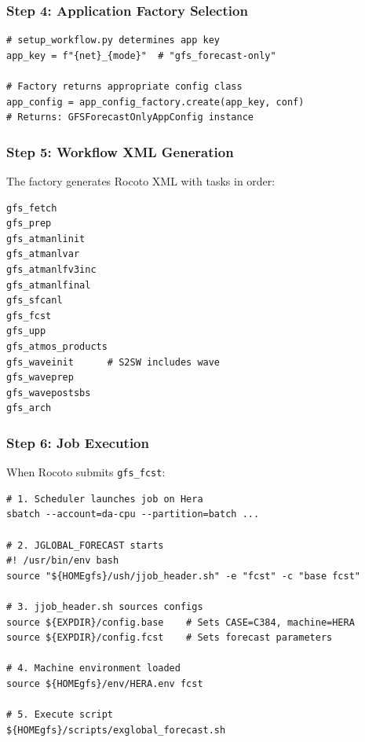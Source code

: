 \documentclass[11pt,letterpaper]{article}
\begin{document}
\subsubsection{Step 4: Application Factory Selection}

\begin{lstlisting}[style=pythonstyle, title=Factory Selection]
# setup_workflow.py determines app key
app_key = f"{net}_{mode}"  # "gfs_forecast-only"

# Factory returns appropriate config class
app_config = app_config_factory.create(app_key, conf)
# Returns: GFSForecastOnlyAppConfig instance
\end{lstlisting}

\subsubsection{Step 5: Workflow XML Generation}

The factory generates Rocoto XML with tasks in order:

\begin{lstlisting}[style=bashstyle, title=Generated Task Order]
gfs_fetch
gfs_prep
gfs_atmanlinit
gfs_atmanlvar
gfs_atmanlfv3inc
gfs_atmanlfinal
gfs_sfcanl
gfs_fcst
gfs_upp
gfs_atmos_products
gfs_waveinit      # S2SW includes wave
gfs_waveprep
gfs_wavepostsbs
gfs_arch
\end{lstlisting}

\subsubsection{Step 6: Job Execution}

When Rocoto submits \texttt{gfs\_fcst}:

\begin{lstlisting}[style=bashstyle, title=Runtime Execution Flow]
# 1. Scheduler launches job on Hera
sbatch --account=da-cpu --partition=batch ...

# 2. JGLOBAL_FORECAST starts
#! /usr/bin/env bash
source "${HOMEgfs}/ush/jjob_header.sh" -e "fcst" -c "base fcst"

# 3. jjob_header.sh sources configs
source ${EXPDIR}/config.base    # Sets CASE=C384, machine=HERA
source ${EXPDIR}/config.fcst    # Sets forecast parameters

# 4. Machine environment loaded
source ${HOMEgfs}/env/HERA.env fcst

# 5. Execute script
${HOMEgfs}/scripts/exglobal_forecast.sh
\end{lstlisting}
\end{document}
